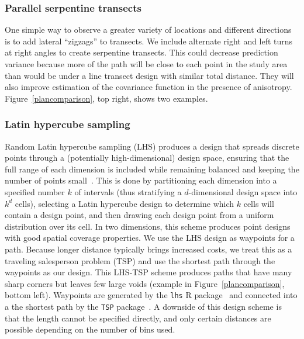 \documentclass[review]{elsarticle}
\begin{document}
\subsubsection{Parallel serpentine transects}

One simple way to observe a greater variety of locations and different
directions is to add lateral ``zigzags'' to transects. We include alternate
right and left turns at right angles to create serpentine transects. This could
decrease prediction variance because more of the path will be close to each
point in the study area than would be under a line transect design with similar
total distance. They will also improve estimation of the covariance function
in the presence of anisotropy. Figure~\ref{plancomparison}, top right, shows
two examples.



\subsubsection{Latin hypercube sampling}

Random Latin hypercube sampling (LHS) produces a design that spreads discrete
points through a (potentially high-dimensional) design space, ensuring that
the full range of each dimension is included while remaining balanced and
keeping the number of points small~\citep{mckayetal}. This is done by
partitioning each dimension into a specified number \(k\) of intervals (thus
stratifying a \(d\)-dimensional design space into \(k^{d}\) cells), selecting
a Latin hypercube design to determine which \(k\) cells will contain a design
point, and then drawing each design point from a uniform distribution over its
cell. In two dimensions, this scheme produces point designs with good spatial
coverage properties. We use the LHS design as waypoints for a path. Because
longer distance typically brings increased costs, we treat this as a traveling
salesperson problem (TSP) and use the shortest path through the waypoints as
our design. This LHS-TSP scheme produces paths that have many sharp corners but
leaves few large voids (example in Figure~\ref{plancomparison}, bottom left).
Waypoints are generated by the \texttt{lhs} R package~\citep{lhs} and connected
into a the shortest path by the \texttt{TSP} package~\citep{tsp}. A downside of
this design scheme is that the length cannot be specified directly, and only
certain distances are possible depending on the number of bins used.
\end{document}

